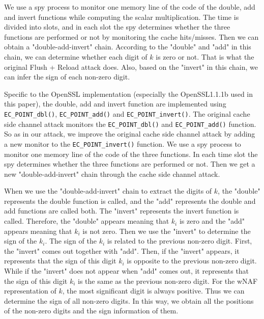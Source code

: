 We use a spy process to monitor one memory line of the code of the double, add and invert functions while computing the scalar multiplication.
The time is divided into slots, and in each slot
  the spy determines whether the three functions are performed or not by monitoring the cache hits/misses.
 Then we can obtain a "double-add-invert" chain.
According to the "double" and "add" in this chain, we can determine whether each digit of $k$ is zero or not.
  That is what the original Flush + Reload attack does.
Also, based on the "invert" in this chain, we can infer the sign of each non-zero digit.


Specific to the OpenSSL implementation (especially the OpenSSL1.1.1b used in this paper),
  the double, add and invert function are implemented using  \verb+EC_POINT_dbl()+, \verb+EC_POINT_add()+ and \verb+EC_POINT_invert()+.
 The original cache side channel attack monitors the \verb+EC_POINT_dbl()+ and \verb+EC_POINT_add()+ function.
So as in our attack, we improve the original cache side channel attack by adding a new monitor to the \verb+EC_POINT_invert()+ function.
We use a spy process to monitor one memory line of the code of the three functions.
 In each time slot
  the spy determines whether the three functions are performed or not.
Then we get a new "double-add-invert" chain through the cache side channel attack.



When we use the "double-add-invert" chain to extract the digits of $k$,
the "double" represents the double function is called,
and the "add" represents the double and add functions are called both.
The "invert" represents the invert function is called.
Therefore,
 the "double" appears meaning that $k_i$ is zero
and the "add" appears meaning that $k_i$ is not zero.
 Then we use the "invert" to determine the sign of the $k_i$.
The sign of the $k_i$ is related to the previous non-zero digit.
First, the "invert" comes out together with "add".
 Then, if the "invert" appears, it represents that the sign of this digit $k_i$ is opposite to the previous non-zero digit.
 While if the "invert" does not appear when "add" comes out, it represents that
the sign of this digit $k_i$ is the same as the previous non-zero digit.
 For the wNAF representation of $k$, the most significant digit is always positive.
 Thus we can determine the sign of all non-zero digits.
In this way, we obtain all the positions of the non-zero digits and the sign information of them.


